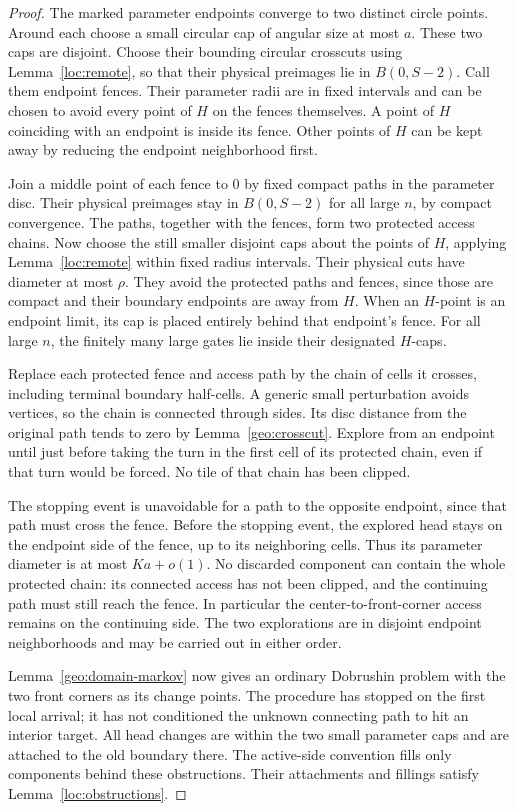 \begin{proof}
The marked parameter endpoints converge to two distinct circle
points. Around each choose a small circular cap of angular
size at most \(a\). These two caps are disjoint. Choose their
bounding circular crosscuts using Lemma~\ref{loc:remote},
so that their physical preimages lie in \(B(0,S-2)\).
Call them endpoint fences. Their parameter radii are in
fixed intervals and can be chosen to avoid every point of
\(H\) on the fences themselves. A point of \(H\) coinciding
with an endpoint is inside its fence. Other points of
\(H\) can be kept away by reducing the endpoint neighborhood
first.

Join a middle point of each fence to \(0\) by fixed compact
paths in the parameter disc. Their physical preimages stay
in \(B(0,S-2)\) for all large \(n\), by compact convergence.
The paths, together with the fences, form two protected
access chains. Now choose the still smaller disjoint
caps about the points of \(H\), applying
Lemma~\ref{loc:remote} within fixed radius intervals.
Their physical cuts have diameter at most \(\rho\).
They avoid the protected paths and fences, since those
are compact and their boundary endpoints are away from
\(H\). When an \(H\)-point is an endpoint limit, its cap
is placed entirely behind that endpoint's fence.
For all large \(n\), the finitely many large gates lie
inside their designated \(H\)-caps.

Replace each protected fence and access path by the chain
of cells it crosses, including terminal boundary
half-cells. A generic small perturbation avoids vertices,
so the chain is connected through sides. Its disc
distance from the original path tends to zero by
Lemma~\ref{geo:crosscut}. Explore from an endpoint until
just before taking the turn in the first cell of its
protected chain, even if that turn would be forced.
No tile of that chain has been clipped.

The stopping event is unavoidable for a path to the
opposite endpoint, since that path must cross the fence.
Before the stopping event, the explored head stays on
the endpoint side of the fence, up to its neighboring
cells. Thus its parameter diameter is at most \(Ka+o(1)\).
No discarded component can contain the whole protected
chain: its connected access has not been clipped, and
the continuing path must still reach the fence. In
particular the center-to-front-corner access remains
on the continuing side. The two explorations are in
disjoint endpoint neighborhoods and may be carried out
in either order.

Lemma~\ref{geo:domain-markov} now gives an ordinary
Dobrushin problem with the two front corners as its
change points. The procedure has stopped on the first
local arrival; it has not conditioned the unknown
connecting path to hit an interior target.
All head changes are within the two small parameter
caps and are attached to the old boundary there.
The active-side convention fills only components
behind these obstructions. Their attachments and
fillings satisfy Lemma~\ref{loc:obstructions}.
\end{proof}

